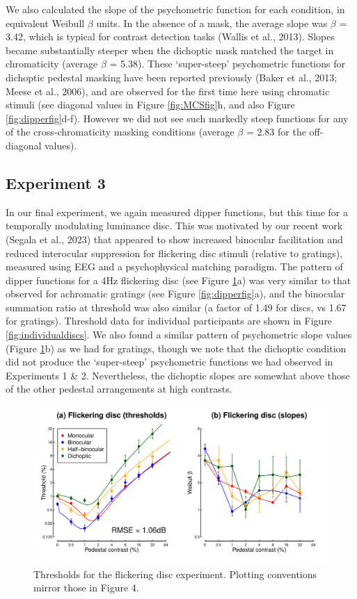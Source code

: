 \documentclass[
]{article}
\begin{document}
We also calculated the slope of the psychometric function for each condition, in equivalent Weibull \(\beta\) units. In the absence of a mask, the average slope was \(\beta\) = 3.42, which is typical for contrast detection tasks (Wallis et al., 2013). Slopes became substantially steeper when the dichoptic mask matched the target in chromaticity (average \(\beta\) = 5.38). These `super-steep' psychometric functions for dichoptic pedestal masking have been reported previously (Baker et al., 2013; Meese et al., 2006), and are observed for the first time here using chromatic stimuli (see diagonal values in Figure \ref{fig:MCSfig}h, and also Figure \ref{fig:dipperfig}d-f). However we did not see such markedly steep functions for any of the cross-chromaticity masking conditions (average \(\beta\) = 2.83 for the off-diagonal values).

\hypertarget{experiment-3}{%
\subsection{Experiment 3}\label{experiment-3}}

In our final experiment, we again measured dipper functions, but this time for a temporally modulating luminance disc. This was motivated by our recent work (Segala et al., 2023) that appeared to show increased binocular facilitation and reduced interocular suppression for flickering disc stimuli (relative to gratings), measured using EEG and a psychophysical matching paradigm. The pattern of dipper functions for a 4Hz flickering disc (see Figure \ref{fig:discdata}a) was very similar to that observed for achromatic gratings (see Figure \ref{fig:dipperfig}a), and the binocular summation ratio at threshold was also similar (a factor of 1.49 for discs, vs 1.67 for gratings). Threshold data for individual participants are shown in Figure \ref{fig:individualdiscs}. We also found a similar pattern of psychometric slope values (Figure \ref{fig:discdata}b) as we had for gratings, though we note that the dichoptic condition did not produce the `super-steep' psychometric functions we had observed in Experiments 1 \& 2. Nevertheless, the dichoptic slopes are somewhat above those of the other pedestal arrangements at high contrasts.

\begin{figure}

{\centering \includegraphics[width=0.8\linewidth]{Figures/discdata} 

}

\caption{Thresholds for the flickering disc experiment. Plotting conventions mirror those in Figure 4.}\label{fig:discdata}
\end{figure}
\end{document}
